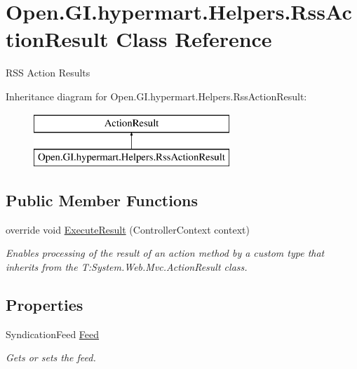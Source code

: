 \hypertarget{class_open_1_1_g_i_1_1hypermart_1_1_helpers_1_1_rss_action_result}{}\section{Open.\+G\+I.\+hypermart.\+Helpers.\+Rss\+Action\+Result Class Reference}
\label{class_open_1_1_g_i_1_1hypermart_1_1_helpers_1_1_rss_action_result}


R\+S\+S Action Results  


Inheritance diagram for Open.\+G\+I.\+hypermart.\+Helpers.\+Rss\+Action\+Result\+:\begin{figure}[H]
\begin{center}
\leavevmode
\includegraphics[height=2.000000cm]{class_open_1_1_g_i_1_1hypermart_1_1_helpers_1_1_rss_action_result}
\end{center}
\end{figure}
\subsection*{Public Member Functions}
\begin{DoxyCompactItemize}
\item 
override void \hyperlink{class_open_1_1_g_i_1_1hypermart_1_1_helpers_1_1_rss_action_result_a18ff30f679b2858b2d88a7dc267fd672}{Execute\+Result} (Controller\+Context context)
\begin{DoxyCompactList}\small\item\em Enables processing of the result of an action method by a custom type that inherits from the T\+:\+System.\+Web.\+Mvc.\+Action\+Result class. \end{DoxyCompactList}\end{DoxyCompactItemize}
\subsection*{Properties}
\begin{DoxyCompactItemize}
\item 
Syndication\+Feed \hyperlink{class_open_1_1_g_i_1_1hypermart_1_1_helpers_1_1_rss_action_result_a3b07cc4558b6a4863821fbedd9aa6888}{Feed}
\begin{DoxyCompactList}\small\item\em Gets or sets the feed. \end{DoxyCompactList}\end{DoxyCompactItemize}


